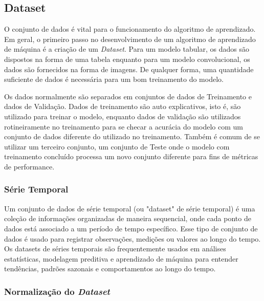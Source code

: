 \subsection{\textbf{Dataset}}
\label{dataset}

O conjunto de dados é vital para o funcionamento do algoritmo de aprendizado. Em geral, o primeiro passo no desenvolvimento de um algoritmo de aprendizado de máquina é a criação de um \textit{Dataset}. Para um modelo tabular, os dados são dispostos na forma de uma tabela enquanto para um modelo convolucional, os dados são fornecidos na forma de imagens. De qualquer forma, uma quantidade suficiente de dados é necessária para um bom treinamento do modelo.

Os dados normalmente são separados em conjuntos de dados de Treinamento e dados de Validação. Dados de treinamento são auto explicativos, isto é, são utilizado para treinar o modelo, enquanto dados de validação são utilizados rotineiramente no treinamento para se checar a acurácia do modelo com um conjunto de dados diferente do utilizado no treinamento. Também é comum de se utilizar um terceiro conjunto, um conjunto de Teste onde o modelo com treinamento concluído processa um novo conjunto diferente para fins de métricas de performance.


\subsubsection{\textbf{Série Temporal}}
Um conjunto de dados de série temporal (ou "dataset" de série temporal) é uma coleção de informações organizadas de maneira sequencial, onde cada ponto de dados está associado a um período de tempo específico. Esse tipo de conjunto de dados é usado para registrar observações, medições ou valores ao longo do tempo. 
Os datasets de séries temporais são frequentemente usados em análises estatísticas, modelagem preditiva e aprendizado de máquina para entender tendências, padrões sazonais e comportamentos ao longo do tempo.

\subsubsection{\textbf{Normalização do \textit{Dataset}}}

